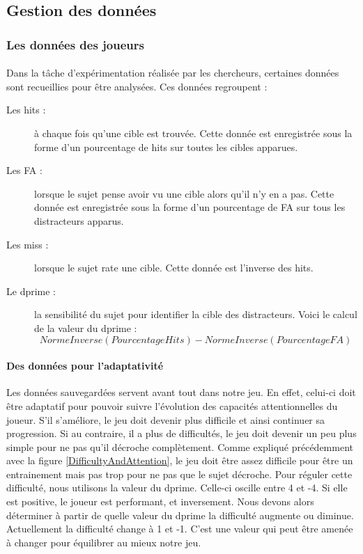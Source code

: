 \subsection{Gestion des données}
\label{Donnees}

\subsubsection{Les données des joueurs}

\paragraph{}Dans la tâche d'expérimentation réalisée par les chercheurs, certaines données sont recueillies pour être analysées. Ces données regroupent :
\begin{description}
\item[Les hits :] à chaque fois qu'une cible est trouvée. Cette donnée est enregistrée sous la forme d'un pourcentage de hits sur toutes les cibles apparues.
\item[Les FA :] lorsque le sujet pense avoir vu une cible alors qu'il n'y en a pas. Cette donnée est enregistrée sous la forme d'un pourcentage de FA sur tous les distracteurs apparus.
\item[Les miss :] lorsque le sujet rate une cible. Cette donnée est l'inverse des hits.
\item[Le dprime :] la sensibilité du sujet pour identifier la cible des distracteurs. Voici le calcul de la valeur du dprime : \[NormeInverse(PourcentageHits) - NormeInverse(PourcentageFA)\]
\end{description}

\paragraph{Des données pour l'adaptativité}Les données sauvegardées servent avant tout dans notre jeu. En effet, celui-ci doit être adaptatif pour pouvoir suivre l'évolution des
capacités attentionnelles du joueur. S'il s'améliore, le jeu doit devenir plus difficile et ainsi continuer sa progression. Si au contraire, il a plus de difficultés, le jeu doit
devenir un peu plus simple pour ne pas qu'il décroche complètement. Comme expliqué précédemment avec la figure \ref{DifficultyAndAttention}, le jeu doit être assez difficile pour être
un entrainement mais pas trop pour ne pas que le sujet décroche. Pour réguler cette difficulté, nous utilisons la valeur du dprime. Celle-ci oscille entre 4 et -4. Si elle est positive,
le joueur est performant, et inversement. Nous devons alors déterminer à partir de quelle valeur du dprime la difficulté augmente ou diminue. Actuellement la difficulté change à 1 et
-1. C'est une valeur qui peut être amenée à changer pour équilibrer au mieux notre jeu.

